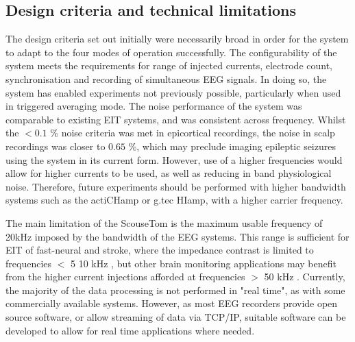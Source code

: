 \subsection{Design criteria and technical limitations}
The design criteria set out initially were necessarily broad in order for the system to adapt to the four modes of operation successfully. The configurability of the system meets the requirements for range of injected currents, electrode count, synchronisation and recording of simultaneous EEG signals. In doing so, the system has enabled experiments not previously possible, particularly when used in triggered averaging mode. The noise performance of the system was comparable to existing EIT systems, and was consistent across frequency. Whilst the  $<0.1$ \% noise criteria was met in epicortical recordings, the noise in scalp recordings was closer to $0.65$ \%, which may preclude imaging epileptic seizures using the system in its current form. However, use of a higher frequencies would allow for higher currents to be used, as well as reducing in band physiological noise. Therefore, future experiments should be performed with higher bandwidth systems such as the actiCHamp or g.tec HIamp, with a higher carrier frequency. 

The main limitation of the ScouseTom is the maximum usable frequency of 20kHz imposed by the bandwidth of the EEG systems. This range is sufficient for EIT of fast-neural and stroke, where the impedance contrast is limited to frequencies $<$ 5 10 kHz \cite{Malone2014a,Aristovich_2016,Vongerichten_2016}, but other brain monitoring applications may benefit from the higher current injections afforded at frequencies $>$ 50 kHz \cite{Fabrizi_2006,fu2014use,Manwaring2013}. Currently, the majority of the data processing is not performed in "real time", as with some commercially available systems. However, as most EEG recorders provide open source software, or allow streaming of data via TCP/IP, suitable software can be developed to allow for real time applications where needed. 